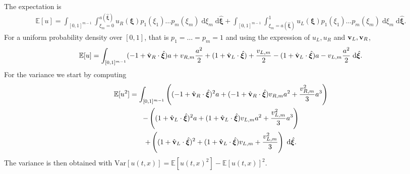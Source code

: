 \documentclass{article}
\newcommand{\bfxi}{ {\bm \xi} }
\newcommand{\E}{ \mathbb E }
\newcommand{\diff}{ \; \text{d} }
\newcommand{\var}{ \text{Var} }
\begin{document}
The expectation is 
\begin{multline}
    \E[u] = \int_{[0,1]^{m-1}} \int_{\xi_m = 0}^{a(\hat \bfxi)} 
          u_R(\bfxi) p_1(\xi_1) \dots p_m(\xi_m)  
    \diff \xi_m \diff \hat \bfxi 
    +  \int_{[0,1]^{m-1}} \int_{\xi_m = a(\hat \bfxi)}^{1} 
        u_L(\bfxi) p_1(\xi_1) \dots p_m(\xi_m)       
    \diff \xi_m \diff \hat \bfxi .
\end{multline}
For a uniform probability density over $[0,1]$, that is $p_1 = \dots = p_m = 1$ and using the expression of $u_L,u_R$ and ${\bf v}_L, {\bf v}_R$,
\begin{equation}
    \E[u]
    = \int_{[0,1]^{m-1}}
          (-1+ \hat {\bf v}_R \cdot \hat \bfxi) a + v_{R,m} \frac{a^2}{2}
    \notag
        + (1 + \hat {\bf v}_L \cdot \hat \bfxi) + \frac{v_{L,m}}{2} 
        - (1 + \hat {\bf v}_L \cdot \hat \bfxi) a - v_{L,m} \frac{a^2}{2} 
    \diff \hat \bfxi .
\end{equation}
For the variance we start by computing
\begin{multline}
    \E[u^2] 
    = \int_{[0,1]^{m-1}}
    \left( 
      (-1 + \hat {\bf v}_R \cdot \hat \bfxi)^2 a
    + (-1 + \hat {\bf v}_R \cdot \hat \bfxi) v_{R,m} a^2
    + \frac{v_{R,m}^2}{3} a^3
    \right)
    \\ 
    -
    \left( 
      (1 + \hat {\bf v}_L \cdot \hat \bfxi)^2 a
    + (1 + \hat {\bf v}_L \cdot \hat \bfxi) v_{L,m} a^2
    + \frac{v_{L,m}^2}{3} a^3
    \right) 
    \\ 
    +
    \left( 
      (1 + \hat {\bf v}_L \cdot \hat \bfxi)^2 
    + (1 + \hat {\bf v}_L \cdot \hat \bfxi) v_{L,m} 
    + \frac{v_{L,m}^2}{3} 
    \right)   
    \diff \hat \bfxi.
\end{multline}
The variance is then obtained with $\var [u(t,x)] = \E[u(t,x)^2]-\E[u(t,x)]^2$. 
\end{document}
